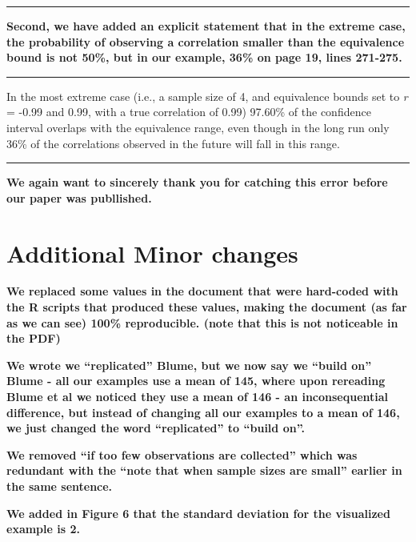 \documentclass[man]{apa6}
\begin{document}
\begin{center}\rule{0.5\linewidth}{\linethickness}\end{center}

\textbf{Second, we have added an explicit statement that in the extreme case, the probability of observing a correlation smaller than the equivalence bound is not 50\%, but in our example, 36\% on page 19, lines 271-275.}

\begin{center}\rule{0.5\linewidth}{\linethickness}\end{center}

In the most extreme case (i.e., a sample size of 4, and equivalence bounds set to \emph{r} = -0.99 and 0.99, with a true correlation of 0.99) 97.60\% of the confidence interval overlaps with the equivalence range, even though in the long run only 36\% of the correlations observed in the future will fall in this range.

\begin{center}\rule{0.5\linewidth}{\linethickness}\end{center}

\textbf{We again want to sincerely thank you for catching this error before our paper was publlished.}

\hypertarget{additional-minor-changes}{%
\section{Additional Minor changes}\label{additional-minor-changes}}

\textbf{We replaced some values in the document that were hard-coded with the R scripts that produced these values, making the document (as far as we can see) 100\% reproducible. (note that this is not noticeable in the PDF)}

\textbf{We wrote we \enquote{replicated} Blume, but we now say we \enquote{build on} Blume - all our examples use a mean of 145, where upon rereading Blume et al we noticed they use a mean of 146 - an inconsequential difference, but instead of changing all our examples to a mean of 146, we just changed the word \enquote{replicated} to \enquote{build on}.}

\textbf{We removed \enquote{if too few observations are collected} which was redundant with the \enquote{note that when sample sizes are small} earlier in the same sentence.}

\textbf{We added in Figure 6 that the standard deviation for the visualized example is 2.}
\end{document}
